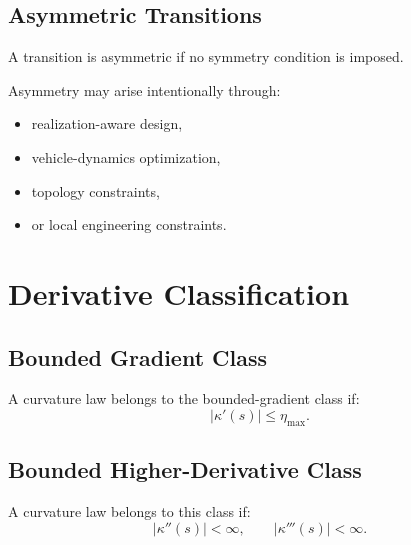 
\subsection{Asymmetric Transitions}

\begin{definition}
\label{def:classification-asymmetric-transition}
A transition is asymmetric if no symmetry condition is imposed.
\end{definition}

Asymmetry may arise intentionally through:
\begin{itemize}
\item realization-aware design,
\item vehicle-dynamics optimization,
\item topology constraints,
\item or local engineering constraints.
\end{itemize}

\section{Derivative Classification}

\subsection{Bounded Gradient Class}

\begin{definition}
\label{def:bounded-gradient-class}
A curvature law belongs to the bounded-gradient class if:
\[
|\kappa'(s)|
\le
\eta_{\max}.
\]
\end{definition}


\subsection{Bounded Higher-Derivative Class}

\begin{definition}
\label{def:bounded-higher-derivative-class}
A curvature law belongs to this class if:
\[
|\kappa''(s)|<\infty,
\qquad
|\kappa'''(s)|<\infty.
\]
\end{definition}

